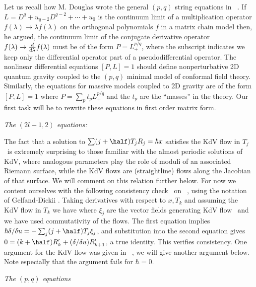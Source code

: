 
Let us recall how M. Douglas wrote the general $(p,q)$ string 
equations in \newD\ . If $L=D^q+u_{q-2}D^{q-2}+\cdots + u_0$
is the continuum limit of a multiplication operator 
$f(\lambda)\to \lambda f(\lambda)$ on the orthogonal 
polynomials $f$ in a 
matrix chain model then, he argued, the continuum limit
of the conjugate derivative operator
$f(\lambda)\to {d\over d \lambda} f(\lambda)$ must be of the 
form $P=L^{p/q}_+$,
where the subscript indicates we keep only the differential
operator part of a pseudodifferential operator.
The nonlinear differential equations $[P,L]=1$ should define
nonperturbative 2D quantum gravity coupled to the $(p,q)$ 
minimal model of conformal field theory. Similarly, the 
equations for massive models coupled to 2D gravity are of the form
$[P,L]=1$ where $P=\sum_p t_p L^{p/q}_+$ and the $t_p$ 
are the ``masses'' in the theory. Our first task will be to 
rewrite these equations in first order matrix form.

{\it The $(2l-1,2)$ equations:}


The fact that a solution to $\sum(j+\half)T_jR_j=\hbar x$
satisfies the KdV flow in $T_j$ 
\bdss\  
is extremely surprising to those
familiar with the almost periodic solutions of KdV, where 
analogous parameters play the role of moduli of an associated 
Riemann surface, while the KdV flows are (straightline)
flows along the Jacobian 
of that surface. We will comment on this relation further below. 
For now we content ourselves with the following consistency 
check \bdss\  on \linsys\ , using the notation of Gelfand-Dickii
\Gelf .
Taking derivatives with respect to 
$x,T_k$ and assuming the KdV flow in $T_k$ we have
\eqn\consis{
\eqalign{
\hbar&=\sum (j+\half)T_jR_j'\cr
0&=(k+\half)R_k'-{1\over \hbar}\sum_j(j+\half)T_j\xi_jR_{k+1}'\cr}
}
where $\xi_j$ are the vector fields generating KdV flow \Gelf\ 
and we have used commutativity of the flows. The first equation 
implies $\hbar \delta/\delta u=-\sum_j(j+\half)T_j\xi_j$, and 
substitution into the second equation gives $0=(k+\half)R_k'+
(\delta/\delta u)R_{k+1}'$, a true identity.
This verifies consistency. One argument for the KdV flow 
was given in \bdss\ , we will give another argument below.
Note especially that the argument fails for $\hbar=0$. 

\bigskip
{\it The $(p,q)$ equations}

